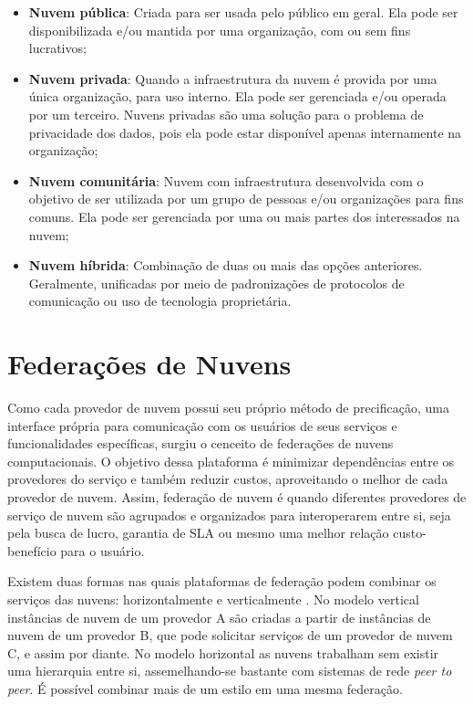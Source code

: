 \begin{itemize}
	\item \textbf{Nuvem pública}: Criada para ser usada pelo público em geral. Ela pode ser disponibilizada e/ou mantida por uma organização, com ou sem fins lucrativos;
	\item \textbf{Nuvem privada}: Quando a infraestrutura da nuvem é provida por uma única organização, para uso interno. Ela pode ser gerenciada e/ou operada por um terceiro. Nuvens privadas são uma solução para o problema de privacidade dos dados, pois ela pode estar disponível apenas internamente na organização;
	\item \textbf{Nuvem comunitária}: Nuvem com infraestrutura desenvolvida com o objetivo de ser utilizada por um grupo de pessoas e/ou organizações para fins comuns. Ela pode ser gerenciada por uma ou mais partes dos interessados na nuvem;
	\item \textbf{Nuvem híbrida}: Combinação de duas ou mais das opções anteriores. Geralmente, unificadas por meio de padronizações de protocolos de comunicação ou uso de tecnologia proprietária.
\end{itemize}

\section{Federações de Nuvens}

Como cada provedor de nuvem possui seu próprio método de precificação, uma interface própria para comunicação com os usuários de seus serviços e funcionalidades específicas, surgiu o cenceito de federações de nuvens computacionais. O objetivo dessa plataforma é minimizar dependências entre os provedores do serviço e também reduzir custos, aproveitando o melhor de cada provedor de nuvem. Assim, federação de nuvem é quando diferentes provedores de serviço de nuvem são agrupados e organizados para interoperarem entre si, seja pela busca de lucro, garantia de \acrshort{SLA} ou mesmo uma melhor relação custo-benefício para o usuário.

Existem duas formas nas quais plataformas de federação podem combinar os serviços das nuvens: horizontalmente e verticalmente \cite{5557976}\cite{7835207}. No modelo vertical instâncias de nuvem de um provedor A são criadas a partir de instâncias de nuvem de um provedor B, que pode solicitar serviços de um provedor de nuvem C, e assim por diante. No modelo horizontal as nuvens trabalham sem existir uma hierarquia entre si, assemelhando-se bastante com sistemas de rede \textit{peer to peer}. É possível combinar mais de um estilo em uma mesma federação.

